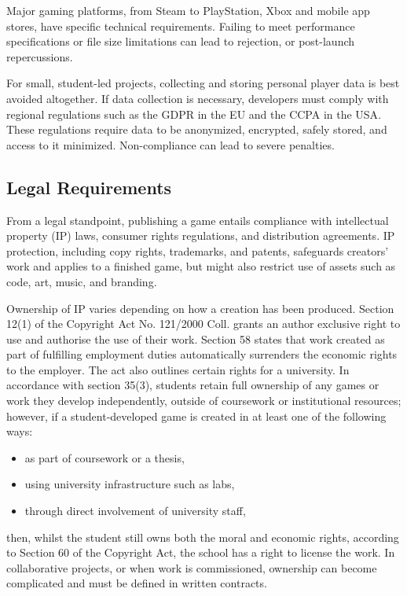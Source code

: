 Major gaming platforms, from Steam to PlayStation, Xbox and mobile app stores, have specific technical requirements. Failing to meet performance specifications or file size limitations can lead to rejection, or post-launch repercussions.
\cite{apple-ios-apps}

For small, student-led projects, collecting and storing personal player data is best avoided altogether. If data collection is necessary, developers must comply with regional regulations such as the GDPR in the EU and the CCPA in the USA\cite{eu_gdpr, doj_ccpa}. These regulations require data to be anonymized, encrypted, safely stored, and access to it minimized. Non-compliance can lead to severe penalties.
\cite{silva_guide-to-release}

\subsection{Legal Requirements}\label{subsec:legal-requirements}
From a legal standpoint, publishing a game entails compliance with intellectual property (IP) laws, consumer rights regulations, and distribution agreements. IP protection, including copy rights, trademarks, and patents, safeguards creators’ work and applies to a finished game, but might also restrict use of assets such as code, art, music, and branding.
\cite{jd-supra_ip}

Ownership of IP varies depending on how a creation has been produced. Section 12(1) of the Copyright Act No. 121/2000 Coll. grants an author exclusive right to use and authorise the use of their work. Section 58 states that work created as part of fulfilling employment duties automatically surrenders the economic rights to the employer. The act also outlines certain rights for a university. In accordance with section 35(3), students retain full ownership of any games or work they develop independently, outside of coursework or institutional resources; however, if a student-developed game is created in at least one of the following ways:
\begin{itemize}
	\item as part of coursework or a thesis,
	\item using university infrastructure such as labs,
	\item through direct involvement of university staff,
\end{itemize}
then, whilst the student still owns both the moral and economic rights, according to Section 60 of the Copyright Act, the school has a right to license the work. In collaborative projects, or when work is commissioned, ownership can become complicated and must be defined in written contracts.
\cite{Kurzy_autorsky-zakon, silva_guide-to-release, jd-supra_ip}

